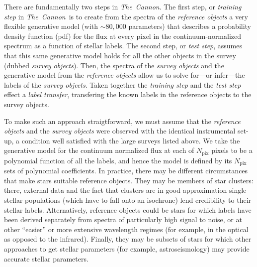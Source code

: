 \documentclass[12pt, preprint]{aastex}
\newcommand{\tc}{\textsl{The~Cannon}}
\newcommand{\pix}{\mathrm{pix}}
\begin{document}
There are fundamentally two steps in \tc. 
The first step, or \textit{training step} in \tc\ is to create from the spectra of the \textit{reference objects} a very flexible generative model (with $\sim 80,000$ parameters) that describes a probability density function (pdf) for
 the flux at every pixel in the continuum-normalized spectrum as a function of stellar labels.
The second step, or \textit{test step}, assumes that this same generative model holds for all the other objects in the survey (dubbed \textit{survey objects}). 
Then, the spectra of the \textit{survey objects} and the generative model from the \textit{reference objects}
allow us to solve for---or infer---the labels of the \textit{survey objects}. 
Taken together the \textit{training step} and the \textit{test step} effect a \textit{label transfer},
transfering the known labels in the reference objects to the survey objects.

To make such an approach straigtforward, we must assume that the \textit{reference objects} and the \textit{survey objects} were observed with the identical instrumental set-up, a condition well satisfied with the large surveys listed above. 
We take the generative model for the continuum normalized flux at each of $N_\pix$ pixels to be a polynomial function of all the labels, and hence the model is defined by its $N_\pix$ sets of polynomial coefficients. In practice, there may be different circumstances that make stars suitable reference objects. 
They may be members of star clusters: there, external data and the fact that clusters are in good approximation single stellar populations (which have to fall onto an isochrone) lend credibility to their stellar labels. 
Alternatively, reference objects could be stars for which labels have been derived separately from spectra of particularly high signal to noise, or at other ``easier'' or more extensive wavelength regimes (for example, in the optical as opposed to the infrared). 
Finally, they may be subsets of stars for which other approaches to get stellar parameters (for example, astroseismology) may provide accurate stellar parameters.
\end{document}
